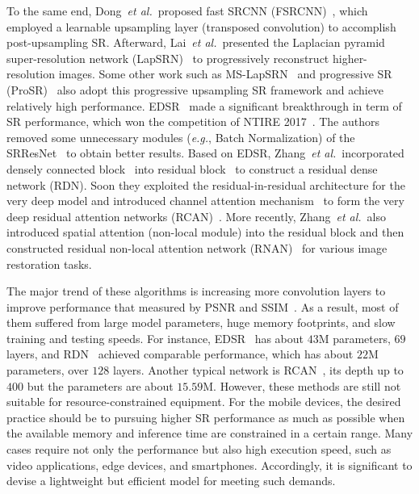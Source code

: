 \documentclass[sigconf]{acmart}
\newcommand{\etal}{\emph{et al.}~}
\newcommand{\eg}{\emph{e.g.}}
\begin{document}
To the same end, Dong~\etal proposed fast SRCNN (FSRCNN)~\cite{FSRCNN}, which employed a learnable upsampling layer (transposed convolution) to accomplish post-upsampling SR. Afterward, Lai~\etal presented the Laplacian pyramid super-resolution network (LapSRN)~\cite{LapSRN} to progressively reconstruct higher-resolution images. Some other work such as MS-LapSRN~\cite{MS-LapSRN} and progressive SR (ProSR)~\cite{ProSR} also adopt this progressive upsampling SR framework and achieve relatively high performance. EDSR~\cite{EDSR} made a significant breakthrough in term of SR performance, which won the competition of NTIRE 2017~\cite{NTIRE2017_dataset,NTIRE2017_methods}. The authors removed some unnecessary modules (\eg, Batch Normalization) of the SRResNet~\cite{SRGAN} to obtain better results. Based on EDSR, Zhang~\etal incorporated densely connected block~\cite{DenseNet,SRDenseNet} into residual block~\cite{ResNet} to construct a residual dense network (RDN). Soon they exploited the residual-in-residual architecture for the very deep model and introduced channel attention mechanism~\cite{SENet} to form the very deep residual attention networks (RCAN)~\cite{RCAN}. More recently, Zhang~\etal also introduced spatial attention (non-local module) into the residual block and then constructed residual non-local attention network (RNAN)~\cite{RNAN} for various image restoration tasks.

The major trend of these algorithms is increasing more convolution layers to improve performance that measured by PSNR and SSIM~\cite{SSIM}. As a result, most of them suffered from large model parameters, huge memory footprints, and slow training and testing speeds. For instance, EDSR~\cite{EDSR} has about $43$M parameters, $69$ layers, and RDN~\cite{RDN} achieved comparable performance, which has about $22$M parameters, over $128$ layers. Another typical network is RCAN~\cite{RCAN}, its depth up to $400$ but the parameters are about $15.59$M. However, these methods are still not suitable for resource-constrained equipment. For the mobile devices, the desired practice should be to pursuing higher SR performance as much as possible when the available memory and inference time are constrained in a certain range. 
Many cases require not only the performance but also high execution speed, such as video applications, edge devices, and smartphones. Accordingly, it is significant to devise a lightweight but efficient model for meeting such demands. 
\end{document}
